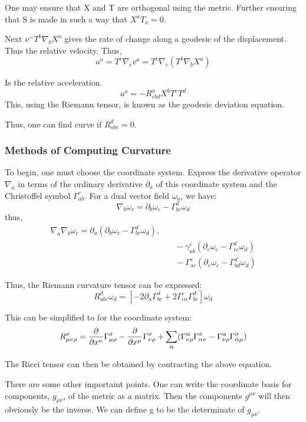 One may ensure that X and T are orthogonal using the metric. Further ensuring that S is made in such a way that $X^a T_a =0$.

Next $\nu^ = T^b \nabla_b X^a$ gives the rate of change along a geodesic of the displacement. Thus the relative velocity. Thus,
\[
a^a=T^c \nabla_c v^a = T^c \nabla_c(T^b \nabla_b X^a)
\]

Is the relative acceleration.
\[
a^a = -R_{cbd}^a X^b T^c T^d
\]
This, using the Riemann tensor, is known as the geodesic deviation equation.

Thus, one can find curve if $R_{abc}^d = 0$.

\subsubsection{Methods of Computing Curvature}

To begin, one must choose the coordinate system. Express the derivative operator $\nabla_a$ in terms of the ordinary derivative $\partial_a$ of this coordinate system and the Christoffel symbol $\Gamma^c_{ab}$. For a dual vector field $\omega_a$, we have:
\[
\nabla_b \omega_c = \partial_b \omega_c - \Gamma^d_{bc} \omega_d
\]
thus,
\begin{align}
  \nabla_a \nabla_b \omega_c = \partial_a(\partial_b \omega_c - \Gamma^d_{bc} \omega_d), \\
  &\quad - \gamma^e_{ab}(\partial_e \omega_c - \Gamma^d_{ec}\omega_d) \\
  &\quad - \Gamma^e_{ac}(\partial_e \omega_c - \Gamma^d_{bd} \omega_d)
\end{align}

Thus, the Riemann curvature tensor can be expressed:
\[
R_{abc}^d \omega_d = [-2 \partial_{a}\Gamma^d_{bc} + 2 \Gamma^e_{ca} \Gamma^d_{be}] \omega_d
\]

This can be simplified to for the coordinate system:
\[
R_{\mu \nu \rho}^\sigma = \pdv{x^\nu} \Gamma^\sigma_{\mu \rho} - \pdv{x^\mu}\Gamma^\sigma_{\nu \rho} + \sum_\alpha (\Gamma^\alpha_{\nu \rho} \Gamma^\sigma_{\alpha \nu} - \Gamma^\alpha_{\nu \rho} \Gamma^\sigma_{\alpha \mu})
\]

The Ricci tensor can then be obtained by contracting the above equation.

There are some other importaint points. One can write the coordinate basis for components, $g_{\mu \nu}$, of the metric as a matrix. Then the components $g^{\mu \nu}$ will then obviously be the inverse. We can define g to be the determinate of $g_{\mu \nu}$.

